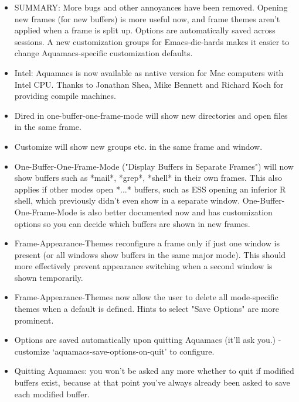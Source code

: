 \begin{itemize}

\item  SUMMARY: More bugs and other annoyances 
	have been removed. Opening new frames (for new buffers) is more
	useful now, and frame themes aren't applied when a frame is split
	up. Options are automatically saved across sessions. A new
	customization groups for Emacs-die-hards makes it easier to change
	Aquamacs-specific customization defaults. 

\item  Intel: Aquamacs is now available as native version for Mac
	computers with Intel CPU.  Thanks to Jonathan Shea, Mike Bennett
	and Richard Koch for providing compile machines.
	
\item  Dired in one-buffer-one-frame-mode will show new
	directories and open files in the same frame.

\item  Customize will show new groups etc. in the same frame and window.

\item  One-Buffer-One-Frame-Mode ("Display Buffers in Separate Frames")
	will now show buffers such as *mail*, *grep*, *shell* in their own
	frames. This also applies if other modes open *...* buffers, such
	as ESS opening an inferior R shell, which previously didn't even
	show in a separate window. One-Buffer-One-Frame-Mode is also better
	documented now and has customization options so you can decide
	which buffers are shown in new frames.	
 	 
\item  Frame-Appearance-Themes reconfigure a frame only if just one
	window is present (or all windows show buffers in the same major
	mode). This should more effectively prevent appearance switching
	when a second window is shown temporarily.

\item  Frame-Appearance-Themes now allow the user to delete all
	mode-specific themes when a default is defined. Hints to select
	"Save Options" are more prominent.

\item  Options are saved automatically upon quitting Aquamacs (it'll
	ask you.) - customize `aquamacs-save-options-on-quit' to
	configure.

\item  Quitting Aquamacs: you won't be asked any more whether to quit
	if modified buffers exist, because at that point you've always already
	been asked to save each modified buffer.
	

\end{itemize}

